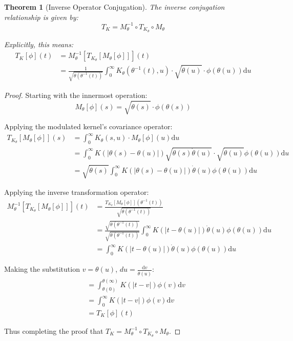 \documentclass{article}
\newtheorem{theorem}{Theorem}
\newcommand{\dd}{\mathrm{d}}
\newcommand{\dottheta}{\dot{\theta}}
\begin{document}
\begin{theorem}[Inverse Operator Conjugation]
The inverse conjugation relationship is given by:
\begin{equation}
T_K = M_\theta^{-1} \circ T_{K_\theta} \circ M_\theta
\end{equation}

Explicitly, this means:
\begin{align}
T_K[\phi](t) &= M_\theta^{-1}[T_{K_\theta}[M_\theta[\phi]]](t)\\
&= \frac{1}{\sqrt{\dottheta(\theta^{-1}(t))}} \int_0^\infty K_\theta(\theta^{-1}(t),u) \cdot \sqrt{\dottheta(u)} \cdot \phi(\theta(u)) \dd u
\end{align}
\end{theorem}

\begin{proof}
Starting with the innermost operation:
\begin{equation}
M_\theta[\phi](s) = \sqrt{\dottheta(s)} \cdot \phi(\theta(s))
\end{equation}

Applying the modulated kernel's covariance operator:
\begin{align}
T_{K_\theta}[M_\theta[\phi]](s) &= \int_0^\infty K_\theta(s,u) \cdot M_\theta[\phi](u) \dd u\\
&= \int_0^\infty K(|\theta(s)-\theta(u)|) \sqrt{\dottheta(s)\dottheta(u)} \cdot \sqrt{\dottheta(u)} \phi(\theta(u)) \dd u\\
&= \sqrt{\dottheta(s)} \int_0^\infty K(|\theta(s)-\theta(u)|) \dottheta(u) \phi(\theta(u)) \dd u
\end{align}

Applying the inverse transformation operator:
\begin{align}
M_\theta^{-1}[T_{K_\theta}[M_\theta[\phi]]](t) &= \frac{T_{K_\theta}[M_\theta[\phi]](\theta^{-1}(t))}{\sqrt{\dottheta(\theta^{-1}(t))}}\\
&= \frac{\sqrt{\dottheta(\theta^{-1}(t))}}{\sqrt{\dottheta(\theta^{-1}(t))}} \int_0^\infty K(|t-\theta(u)|) \dottheta(u) \phi(\theta(u)) \dd u\\
&= \int_0^\infty K(|t-\theta(u)|) \dottheta(u) \phi(\theta(u)) \dd u
\end{align}

Making the substitution $v = \theta(u)$, $du = \frac{\dd v}{\dottheta(u)}$:
\begin{align}
&= \int_{\theta(0)}^{\theta(\infty)} K(|t-v|) \phi(v) \dd v\\
&= \int_0^\infty K(|t-v|) \phi(v) \dd v\\
&= T_K[\phi](t)
\end{align}

Thus completing the proof that $T_K = M_\theta^{-1} \circ T_{K_\theta} \circ M_\theta$.
\end{proof}
\end{document}
